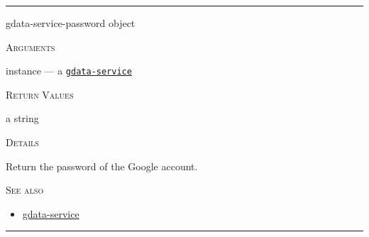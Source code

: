 \documentclass[a4paper]{report}
\begin{document}
  

    \rule{\linewidth}{0.1mm}
    
    \label{cl-gdata-service__fun__gdata-service-password}
    \begin{defun}[Function]
    gdata-service-password object


    
    \bigskip
    \textsc{Arguments}

instance
	--- a \hyperref[cl-gdata-service__class__gdata-service]{\texttt{gdata-service}}
  




    
    \bigskip
    \textsc{Return Values}

a string


	
    \bigskip
    \textsc{Details}

              Return the password of the Google account.


      
    \bigskip
    \textsc{See also}


	
    \begin{itemize}
    
	  
    \item
    \hyperref[cl-gdata-service__class__gdata-service]{gdata-service}
    
	
    \end{itemize}
  
      


    
    \end{defun}
  
  

    \rule{\linewidth}{0.1mm}
    
\end{document}
